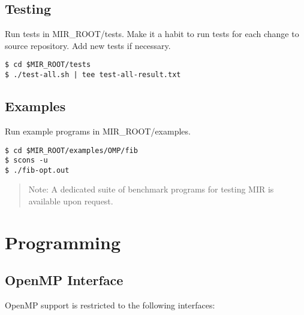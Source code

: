 \documentclass[11pt,a4paper]{article}
\begin{document}
\subsection{Testing}\label{testing}

Run tests in MIR\_ROOT/tests. Make it a habit to run tests for each change to
source repository. Add new tests if necessary.

\begin{lstlisting}[style=MyInputStyle]
$ cd $MIR_ROOT/tests
$ ./test-all.sh | tee test-all-result.txt
\end{lstlisting}

\subsection{Examples}\label{examples}

Run example programs in MIR\_ROOT/examples.

\begin{lstlisting}[style=MyInputStyle]
$ cd $MIR_ROOT/examples/OMP/fib
$ scons -u
$ ./fib-opt.out
\end{lstlisting}

\begin{framed}
\begin{quote}
Note: A dedicated suite of benchmark programs for testing MIR is available upon request.
\end{quote}
\end{framed}

\section{Programming}\label{programming}

\subsection{OpenMP Interface}\label{openmp-interface}

OpenMP support is restricted to the following interfaces:
\end{document}

